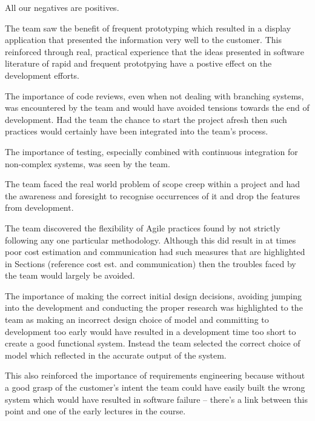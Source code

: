 \documentclass{l3proj}
\begin{document}
All our negatives are positives.

The team saw the benefit of frequent prototyping which resulted in a display application that presented the information very well to the customer. This reinforced through real, practical experience that the ideas presented in software literature of rapid and frequent prototpying have a postive effect on the development efforts.

The importance of code reviews, even when not dealing with branching systems, was encountered by the team and would have avoided tensions towards the end of development. Had the team the chance to start the project afresh then such practices would certainly have been integrated into the team's process.

The importance of testing, especially combined with continuous integration for non-complex systems, was seen by the team.

The team faced the real world problem of scope creep within a project and had the awareness and foresight to recognise occurrences of it and drop the features from development.

The team discovered the flexibility of Agile practices found by not strictly following any one particular methodology. Although this did result in at times poor cost estimation and communication had such measures that are highlighted in Sections (reference cost est. and communication) then the troubles faced by the team would largely be avoided.

The importance of making the correct initial design decisions, avoiding jumping into the development and conducting the proper research was highlighted to the team as making an incorrect design choice of model and committing to development too early would have resulted in a development time too short to create a good functional system. Instead the team selected the correct choice of model which reflected in the accurate output of the system.

This also reinforced the importance of requirements engineering because without a good grasp of the customer's intent the team could have easily built the wrong system which would have resulted in software failure -- there's a link between this point and one of the early lectures in the course.  



\end{document}
